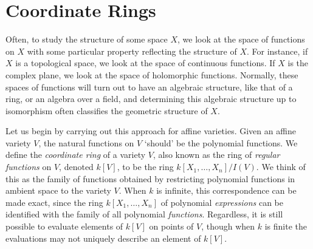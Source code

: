 \section{Coordinate Rings}

Often, to study the structure of some space $X$, we look at the space of functions on $X$ with some particular property reflecting the structure of $X$. For instance, if $X$ is a topological space, we look at the space of continuous functions. If $X$ is the complex plane, we look at the space of holomorphic functions. Normally, these spaces of functions will turn out to have an algebraic structure, like that of a ring, or an algebra over a field, and determining this algebraic structure up to isomorphism often classifies the geometric structure of $X$.

Let us begin by carrying out this approach for affine varieties. Given an affine variety $V$, the natural functions on $V$ `should' be the polynomial functions. We define the \emph{coordinate ring} of a variety $V$, also known as the ring of \emph{regular functions} on $V$, denoted $k[V]$, to be the ring $k[X_1,\dots,X_n]/I(V)$. We think of this as the family of functions obtained by restricting polynomial functions in ambient space to the variety $V$. When $k$ is infinite, this correspondence can be made exact, since the ring $k[X_1,\dots,X_n]$ of polynomial \emph{expressions} can be identified with the family of all polynomial \emph{functions}. Regardless, it is still possible to evaluate elements of $k[V]$ on points of $V$, though when $k$ is finite the evaluations may not uniquely describe an element of $k[V]$.

